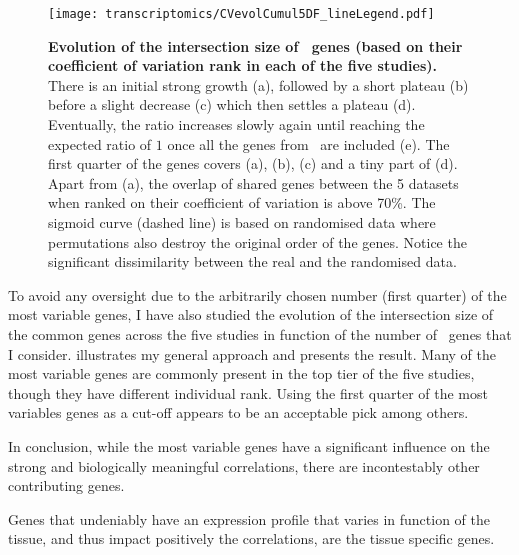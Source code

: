 \begin{figure}[!htpb]
    \texttt{[image: transcriptomics/CVevolCumul5DF\_lineLegend.pdf]}\centering
    \caption[Evolution of the intersection size of \setOne\ genes (ranked by cv)]%
    {\label{fig:cvEvol5DF}\textbf{Evolution of the intersection size
    of \setOne\ genes (based on their coefficient of variation rank
    in each of the five studies).}
    There is an initial strong growth (a),
    followed by a short plateau (b)
    before a slight decrease (c)
    which then settles a plateau (d).
    Eventually, the ratio increases slowly again
    until reaching the expected ratio of $1$ once all the genes from \setOne\
    are included (e).
    The first quarter of the genes covers (a), (b), (c)
    and a tiny part of (d).
    Apart from (a),
    the overlap of shared genes between the 5 datasets when ranked on their
    coefficient of variation is above 70\%.
    The sigmoid curve (dashed line) is based on randomised data
    where permutations also destroy the original order of the genes.
    Notice the significant dissimilarity between the real and the randomised data.}
\end{figure}

To avoid any oversight due to the arbitrarily chosen number (first quarter)
of the most variable genes,
I have also studied the evolution of the intersection size of the common genes
across the five studies
in function of the number of \setOne\ genes that I consider.
 illustrates my general approach and
 presents the result.
Many of the most variable genes are commonly present in the top tier of the
five studies, though they have different individual rank.
Using the first quarter of the most variables genes as a cut-off appears
to be an acceptable pick among others.

\begin{comment}
If the previous analysis was to include
only the first 1,250 most variable genes
the results of \Cref{fig:heatmapMost25pVariable} may be even greater.
However, the dissimilarities highlighted by \Cref{fig:ReverseheatmapMost25pVariable}
would also be greater.
\end{comment}

In conclusion, while the most variable genes have a significant influence
on the strong and biologically meaningful correlations,
there are incontestably other contributing genes.

Genes that undeniably have an expression profile
that varies in function of the tissue,
and thus impact positively the correlations,
are the tissue specific genes.

